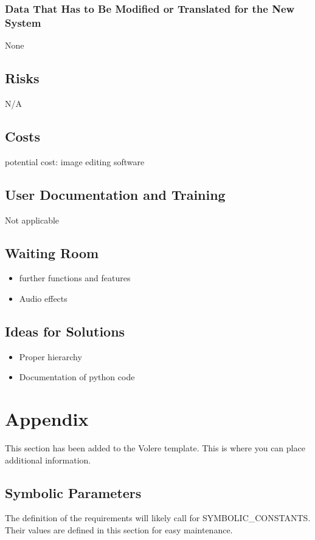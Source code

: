 \documentclass[12pt, titlepage]{article}
\begin{document}
\subsubsection{Data That Has to Be Modified or Translated for the New System}
None
\subsection{Risks}
N/A
\subsection{Costs}
potential cost: image editing software
\subsection{User Documentation and Training}
Not applicable
\subsection{Waiting Room}
\begin{itemize}
    \item further functions and features
	\item Audio effects
\end{itemize}
\subsection{Ideas for Solutions}
\begin{itemize}
    \item Proper hierarchy
	\item Documentation of python code
\end{itemize}

\newpage

\section{Appendix}

This section has been added to the Volere template.  This is where you can place
additional information.

\subsection{Symbolic Parameters}

The definition of the requirements will likely call for SYMBOLIC\_CONSTANTS.
Their values are defined in this section for easy maintenance.

\newpage


\end{document}
